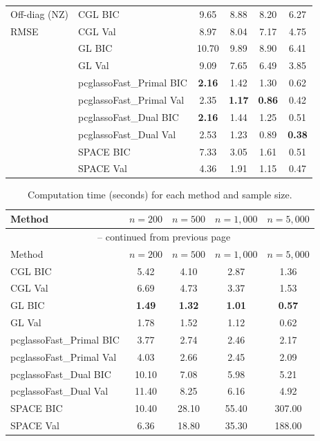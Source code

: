 \documentclass[12pt]{amsart}
\numberwithin{equation}{section}
\numberwithin{equation}{section}
\theoremstyle{plain}
\theoremstyle{definition}
\begin{document}
\begin{longtable}[]{@{}llcccc@{}}
\midrule\noalign{}
Off-diag (NZ) & CGL BIC & 9.65 & 8.88 & 8.20 & 6.27 \\
RMSE & CGL Val & 8.97 & 8.04 & 7.17 & 4.75 \\
 & GL BIC & 10.70 & 9.89 & 8.90 & 6.41 \\
 & GL Val & 9.09 & 7.65 & 6.49 & 3.85 \\
 & pcglassoFast\_Primal BIC & \textbf{2.16} & 1.42 & 1.30 & 0.62 \\
 & pcglassoFast\_Primal Val & 2.35 & \textbf{1.17} & \textbf{0.86} & 0.42 \\
 & pcglassoFast\_Dual BIC & \textbf{2.16} & 1.44 & 1.25 & 0.51 \\
 & pcglassoFast\_Dual Val & 2.53 & 1.23 & 0.89 & \textbf{0.38} \\
 & SPACE BIC & 7.33 & 3.05 & 1.61 & 0.51 \\
 & SPACE Val & 4.36 & 1.91 & 1.15 & 0.47 \\

\end{longtable}

\begin{longtable}[]{@{}lcccc@{}}
\caption{Computation time (seconds) for each method and sample size. \label{tab:hubtime}}\\
\toprule
Method & $n=200$ & $n=500$ & $n=1,000$ & $n=5,000$ \\
\midrule
\endfirsthead

\multicolumn{5}{c}{{\tablename\ \thetable{} -- continued from previous page}} \\
\toprule
Method & $n=200$ & $n=500$ & $n=1,000$ & $n=5,000$ \\
\midrule
\endhead

\bottomrule
\endlastfoot

CGL BIC & 5.42 & 4.10 & 2.87 & 1.36 \\
CGL Val & 6.69 & 4.73 & 3.37 & 1.53 \\
GL BIC & \textbf{1.49} & \textbf{1.32} & \textbf{1.01} & \textbf{0.57} \\
GL Val & 1.78 & 1.52 & 1.12 & 0.62 \\
pcglassoFast\_Primal BIC & 3.77 & 2.74 & 2.46 & 2.17 \\
pcglassoFast\_Primal Val & 4.03 & 2.66 & 2.45 & 2.09 \\
pcglassoFast\_Dual BIC & 10.10 & 7.08 & 5.98 & 5.21 \\
pcglassoFast\_Dual Val & 11.40 & 8.25 & 6.16 & 4.92 \\
SPACE BIC & 10.40 & 28.10 & 55.40 & 307.00 \\
SPACE Val & 6.36 & 18.80 & 35.30 & 188.00 \\

\end{longtable}
\end{document}
